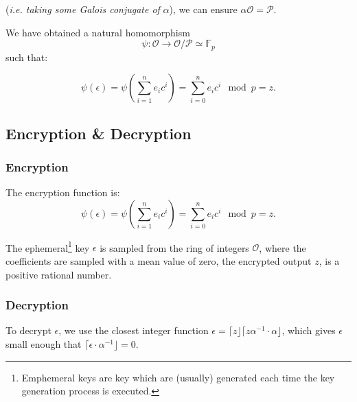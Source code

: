 (\textit{i.e. taking some Galois conjugate of} $\mathit{\alpha}$), we can ensure $ \alpha \mathcal{O} = \mathcal{P}$. 
 
We have obtained a natural homomorphism  \[\psi : \mathcal{O} \rightarrow \mathcal{O}/ \mathcal{P} \simeq \mathbb{F}_{p}\] such that: 

\[ \psi(\epsilon) = \psi \left( \sum_{i=1}^{n}e_{i}c^{i} \right) = \sum_{i=0}^{n} e_{i}c^{i}\mod{p}=z. \]
  
  
  
\subsection{Encryption \& Decryption}

\subsubsection{Encryption}

The encryption function is:
\[\psi(\epsilon) = \psi \left( \sum_{i=1}^{n}e_{i}c^{i} \right) = \sum_{i=0}^{n} e_{i}c^{i}\mod{p}=z. \]

The ephemeral\footnote{Emphemeral keys are key which are (usually)  generated each time the key generation process is executed. } key $\epsilon$ is sampled from the ring of integers $\mathcal{O}$, where the coefficients are sampled with a mean value of zero, the encrypted output $z$, is a positive rational number.

\subsubsection{Decryption}

To decrypt $\epsilon$, we use the closest integer function $\epsilon = \lceil z \rfloor \lceil z\alpha^{-1} \cdot \alpha \rfloor$, which gives $\epsilon$ small enough that $\lceil \epsilon \cdot \alpha^{-1}\rfloor = 0$. 
